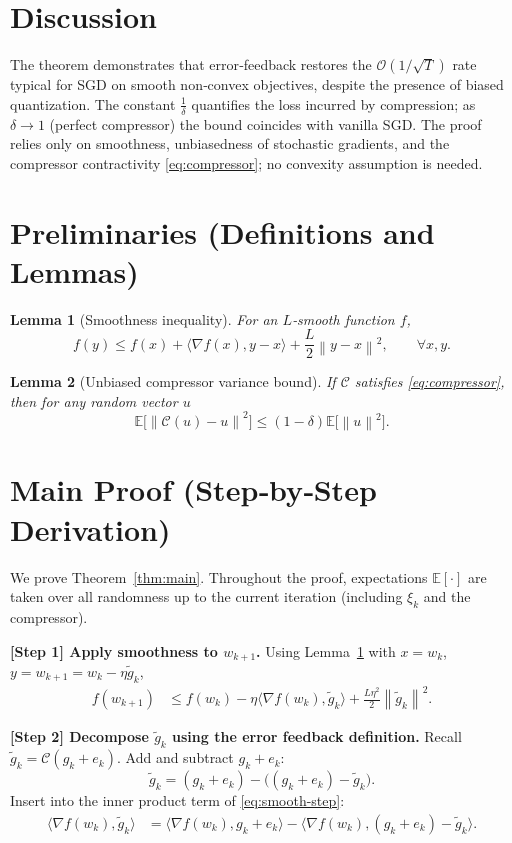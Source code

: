 \documentclass{article}
\newtheorem{lemma}{Lemma}
\newcommand{\E}{\mathbb{E}}
\newcommand{\norm}[1]{\left\|#1\right\|}
\newcommand{\inner}[2]{\langle #1,#2\rangle}
\begin{document}
\section*{Discussion}
The theorem demonstrates that error‑feedback restores the $\mathcal{O}(1/\sqrt{T})$ rate typical for SGD on smooth non‑convex objectives, despite the presence of biased quantization. The constant $\frac{1}{\delta}$ quantifies the loss incurred by compression; as $\delta\to 1$ (perfect compressor) the bound coincides with vanilla SGD. The proof relies only on smoothness, unbiasedness of stochastic gradients, and the compressor contractivity \eqref{eq:compressor}; no convexity assumption is needed.

\newpage
\section*{Preliminaries (Definitions and Lemmas)}
\begin{lemma}[Smoothness inequality]\label{lem:smooth}
For an $L$‑smooth function $f$,
\[
    f(y) \le f(x) + \inner{\nabla f(x)}{y-x} + \frac{L}{2}\norm{y-x}^2,\qquad\forall x,y .
\]
\end{lemma}
\begin{lemma}[Unbiased compressor variance bound]\label{lem:compressor}
If $\mathcal{C}$ satisfies \eqref{eq:compressor}, then for any random vector $u$
\[
    \E\!\big[\norm{\mathcal{C}(u)-u}^2\big]\le (1-\delta)\E\!\big[\norm{u}^2\big].
\]
\end{lemma}

\section*{Main Proof (Step‑by‑Step Derivation)}
We prove Theorem~\ref{thm:main}. Throughout the proof, expectations $\E[\cdot]$ are taken over all randomness up to the current iteration (including $\xi_k$ and the compressor).

\bigskip
\noindent\textbf{[Step 1] Apply smoothness to $w_{k+1}$.}  
Using Lemma~\ref{lem:smooth} with $x=w_k$, $y=w_{k+1}=w_k-\eta\tilde g_k$,
\begin{align}
    f(w_{k+1})
    &\le f(w_k) -\eta\inner{\nabla f(w_k)}{\tilde g_k}
          +\frac{L\eta^2}{2}\norm{\tilde g_k}^2 .
    \label{eq:smooth-step}
\end{align}

\noindent\textbf{[Step 2] Decompose $\tilde g_k$ using the error feedback definition.}  
Recall $\tilde g_k=\mathcal{C}(g_k+e_k)$. Add and subtract $g_k+e_k$:
\[
    \tilde g_k = (g_k+e_k) - \big((g_k+e_k)-\tilde g_k\big).
\]
Insert into the inner product term of \eqref{eq:smooth-step}:
\begin{align}
    \inner{\nabla f(w_k)}{\tilde g_k}
    &= \inner{\nabla f(w_k)}{g_k+e_k}
       -\inner{\nabla f(w_k)}{(g_k+e_k)-\tilde g_k}.
    \label{eq:decompose-inner}
\end{align}
\end{document}
